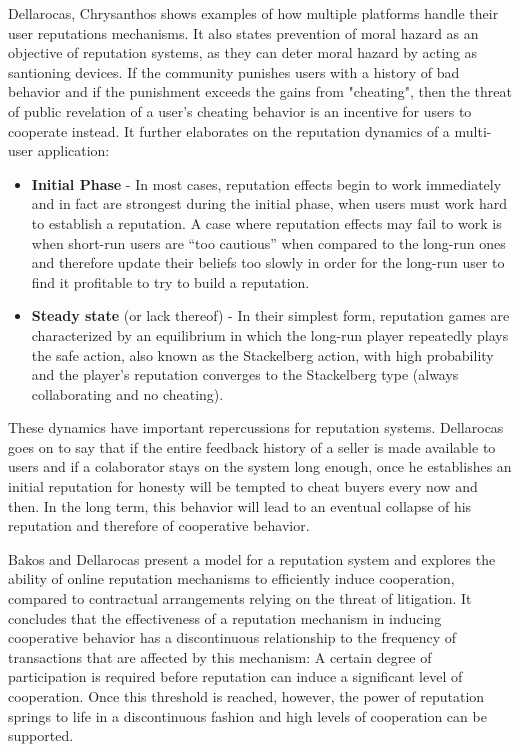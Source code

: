 Dellarocas, Chrysanthos \cite{Dellarocas2005-rep-mech} shows examples of how multiple platforms handle their user reputations mechanisms. It also states prevention of moral hazard as an objective of reputation systems, as they can deter moral hazard by acting as santioning devices. If the community punishes users with a history of bad behavior and if the punishment exceeds the gains from "cheating", then the threat of public revelation of a user's cheating behavior is an incentive for users to cooperate instead. It further elaborates on the reputation dynamics of a multi-user application: 
\begin{itemize}
    \item \textbf{Initial Phase} - In most cases, reputation effects begin to work immediately and in fact are strongest during the initial phase, when users must work hard to establish a reputation. A case where reputation effects may fail to work is when short-run users are “too cautious” when compared to the long-run ones and therefore update their beliefs too slowly in order for the long-run user to find it profitable to try to build a reputation.
    \item \textbf{Steady state} (or lack thereof) - In their simplest form, reputation games are characterized by an equilibrium in which the long-run player repeatedly plays the safe action, also known as the Stackelberg action, with high probability and the player’s reputation converges to the Stackelberg type (always collaborating and no cheating).
\end{itemize}

These dynamics have important repercussions for reputation systems. Dellarocas goes on to say that if the entire feedback history of a seller is made available to users and if a colaborator stays on the system long enough, once he establishes an initial reputation for honesty will be tempted to cheat buyers every now and then. In the long term, this behavior will lead to an eventual collapse of his reputation and therefore of cooperative behavior.

Bakos and Dellarocas \cite{Bakos2003} present a model for a reputation system and explores the ability of online reputation mechanisms to efficiently induce cooperation, compared to contractual arrangements relying on the threat of litigation. It concludes that the effectiveness of a reputation mechanism in inducing cooperative behavior has a discontinuous relationship to the frequency of transactions that are affected by this mechanism: A certain degree of participation is required before reputation can induce a significant level of cooperation. Once this threshold is reached, however, the power of reputation springs to life in a discontinuous fashion and high levels of cooperation can be supported.

